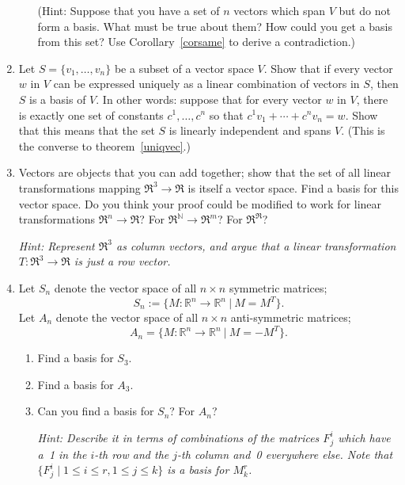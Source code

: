 \begin{enumerate}
\begin{enumerate}
(Hint: Suppose that you have a set of \(n\) vectors which span \(V\) but do not form a basis. What must be true about them? How could you get a basis from this set? Use Corollary~\ref{corsame} to derive a contradiction.)
\end{enumerate}


\item Let $S=\{v_1, \ldots, v_n\}$ be a subset of a vector space $V$.  Show that if every vector $w$ in $V$ can be expressed uniquely as a linear combination of vectors in $S$, then $S$ is a basis of $V$. In other words: suppose that for every vector \(w\) in \(V\), there is exactly one set of constants \(c^1, \ldots, c^n\) so that \(c^1v_1+\cdots+c^nv_n=w\). Show that this means that the set \(S\) is linearly independent and spans \(V\). (This is the converse to theorem~\ref{uniqvec}.)


\item Vectors are objects that you can add together; show that the set of all linear transformations mapping 
$\Re^3\rightarrow \Re$ is itself a vector space.  Find a basis for this vector space.  Do you think your proof could be modified to work for linear transformations $\Re^n\rightarrow \Re$? For $\Re^{\mathbb{N}}\rightarrow \Re^m$? For $\Re^\Re$?

\emph{Hint: Represent $\Re^3$ as column vectors, and argue that a linear transformation $T \colon \Re^3\rightarrow \Re$ is just a row vector. 
}


\item Let $S_n$ denote the vector space of all $n \times n$ symmetric matrices;  \[S_n:=\{M:\mathbb{R}^n\to \mathbb{R}^n ~ |~ M = M^T\}.\] Let $A_n$ denote the vector space of all $n \times n$ anti-symmetric matrices; 
\[A_n=\{M:\mathbb{R}^n\to \mathbb{R}^n ~ |~ M = -M^T\}.\]
\begin{enumerate}
\item Find a basis for $S_3$.

\item Find a basis for $A_3$.

\item %
Can you find a basis for $S_n$? For $A_n$?

\emph{Hint: Describe it in terms of combinations of the matrices $F^i_j$ which have a~1 in the $i$-th row and the $j$-th column and~0 everywhere else. Note that $\{F^i_j \mid 1 \leq i \leq r, 1 \leq j \leq k\}$ is a basis for $M^r_k$.}
\end{enumerate}


\end{enumerate}
